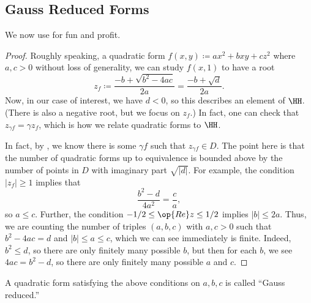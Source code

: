 \documentclass[../notes.tex]{subfiles}
\begin{document}
\subsection{Gauss Reduced Forms}
We now use  for fun and profit.
\classnumberfinite*
\begin{proof}
	Roughly speaking, a quadratic form $f(x,y)\coloneqq ax^2+bxy+cz^2$ where $a,c>0$ without loss of generality, we can study $f(x,1)$ to have a root
	\[z_f\coloneqq\frac{-b+\sqrt{b^2-4ac}}{2a}=\frac{-b+\sqrt{d}}{2a}.\]
	Now, in our case of interest, we have $d<0$, so this describes an element of $\HH$. (There is also a negative root, but we focus on $z_f$.) In fact, one can check that $z_{\gamma f}=\gamma z_f$, which is how we relate quadratic forms to $\HH$.

	In fact, by , we know there is some $\gamma f$ such that $z_{\gamma f}\in D$. The point here is that the number of quadratic forms up to equivalence is bounded above by the number of points in $D$ with imaginary part $\sqrt{|d|}$. For example, the condition $|z_f|\ge1$ implies that
	\[\frac{b^2-d}{4a^2}=\frac ca,\]
	so $a\le c$. Further, the condition $-1/2\le\op{Re}z\le1/2$ implies $|b|\le2a$. Thus, we are counting the number of triples $(a,b,c)$ with $a,c>0$ such that $b^2-4ac=d$ and $|b|\le a\le c$, which we can see immediately is finite. Indeed, $b^2\le d$, so there are only finitely many possible $b$, but then for each $b$, we see $4ac=b^2-d$, so there are only finitely many possible $a$ and $c$.
\end{proof}
\begin{remark}
	A quadratic form satisfying the above conditions on $a,b,c$ is called ``Gauss reduced.''
\end{remark}
\end{document}
